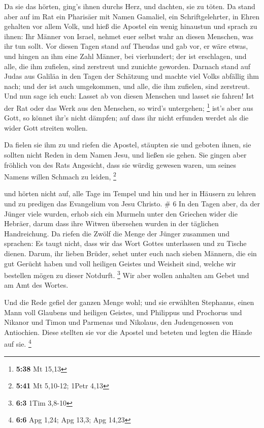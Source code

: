  Da sie das hörten, ging's ihnen durchs Herz, und
dachten, sie zu töten.  Da stand aber auf im Rat ein
Pharisäer mit Namen Gamaliel, ein Schriftgelehrter, in Ehren gehalten
vor allem Volk, und hieß die Apostel ein wenig hinaustun 
und sprach zu ihnen: Ihr Männer von Israel, nehmet euer selbst wahr an
diesen Menschen, was ihr tun sollt.  Vor diesen Tagen
stand auf Theudas und gab vor, er wäre etwas, und hingen an ihm eine
Zahl Männer, bei vierhundert; der ist erschlagen, und alle, die ihm
zufielen, sind zerstreut und zunichte geworden.  Darnach
stand auf Judas aus Galiläa in den Tagen der Schätzung und machte viel
Volks abfällig ihm nach; und der ist auch umgekommen, und alle, die ihm
zufielen, sind zerstreut.  Und nun sage ich euch: Lasset
ab von diesen Menschen und lasset sie fahren! Ist der Rat oder das Werk
aus den Menschen, so wird's untergehen; \footnote{\textbf{5:38} Mt 15,13}
 ist's aber aus Gott, so könnet ihr's nicht dämpfen; auf
dass ihr nicht erfunden werdet als die wider Gott streiten wollen.

 Da fielen sie ihm zu und riefen die Apostel, stäupten
sie und geboten ihnen, sie sollten nicht Reden in dem Namen Jesu, und
ließen sie gehen.  Sie gingen aber fröhlich von des Rats
Angesicht, dass sie würdig gewesen waren, um seines Namens willen
Schmach zu leiden, \footnote{\textbf{5:41} Mt 5,10-12; 1Petr 4,13}

 und hörten nicht auf, alle Tage im Tempel und hin und
her in Häusern zu lehren und zu predigen das Evangelium von Jesu
Christo. \# 6  In den Tagen aber, da der Jünger viele
wurden, erhob sich ein Murmeln unter den Griechen wider die Hebräer,
darum dass ihre Witwen übersehen wurden in der täglichen Handreichung.
 Da riefen die Zwölf die Menge der Jünger zusammen und
sprachen: Es taugt nicht, dass wir das Wort Gottes unterlassen und zu
Tische dienen.  Darum, ihr lieben Brüder, sehet unter euch
nach sieben Männern, die ein gut Gerücht haben und voll heiligen Geistes
und Weisheit sind, welche wir bestellen mögen zu dieser Notdurft.
\footnote{\textbf{6:3} 1Tim 3,8-10}  Wir aber wollen
anhalten am Gebet und am Amt des Wortes.

 Und die Rede gefiel der ganzen Menge wohl; und sie
erwählten Stephanus, einen Mann voll Glaubens und heiligen Geistes, und
Philippus und Prochorus und Nikanor und Timon und Parmenas und Nikolaus,
den Judengenossen von Antiochien.  Diese stellten sie vor
die Apostel und beteten und legten die Hände auf sie. \footnote{\textbf{6:6}
  Apg 1,24; Apg 13,3; Apg 14,23}

